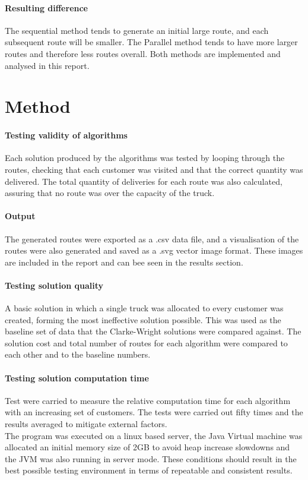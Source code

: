 \documentclass[conference]{acmsiggraph}
\begin{document}
\paragraph{Resulting difference}
The sequential method tends to generate an initial large route, and each subsequent route will be smaller. The Parallel method tends to have more larger routes and therefore less routes overall. Both methods are implemented and analysed in this report.

\section{Method}
\paragraph{Testing validity of algorithms}
Each solution produced by the algorithms was tested by looping through the routes, checking that each customer was visited and that the correct quantity was delivered. The total quantity of deliveries for each route was also calculated, assuring that no route was over the capacity of the truck.

\paragraph{Output}
The generated routes were exported as a .csv data file, and a visualisation of the routes were also generated and saved as a .svg vector image format. These images are included in the report and can bee seen in the results section.

\paragraph{Testing solution quality}
A basic solution in which a single truck was allocated to every customer was created, forming the most ineffective solution possible. This was used as the baseline set of data that the Clarke-Wright solutions were compared against. The solution cost and total number of routes for each algorithm were compared to each other and to the baseline numbers.

\paragraph{Testing solution computation time}
Test were carried to measure the relative computation time for each algorithm with an increasing set of customers. The tests were carried out fifty times and the results averaged to mitigate external factors.\\
The program was executed on a linux based server, the Java Virtual machine was allocated an initial memory size of 2GB to avoid heap increase slowdowns and the JVM was also running in server mode. These conditions should result in the best possible testing environment in terms of  repeatable and consistent results.
\end{document}
